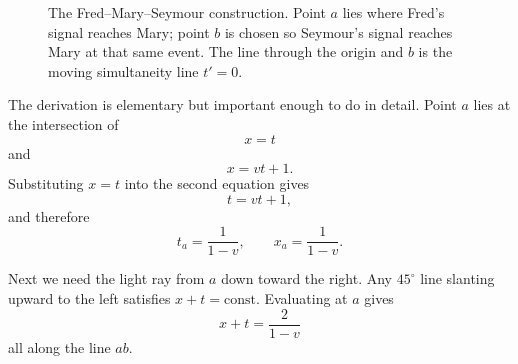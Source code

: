 \begin{figure}
\centering
{}
\caption{The Fred--Mary--Seymour construction. Point \(a\) lies where Fred's signal reaches Mary; point \(b\) is chosen so Seymour's signal reaches Mary at that same event. The line through the origin and \(b\) is the moving simultaneity line \(t'=0\).}
\end{figure}

The derivation is elementary but important enough to do in detail. Point \(a\) lies at the intersection of
\begin{equation}
x=t
\end{equation}
and
\begin{equation}
x=vt+1.
\end{equation}
Substituting \(x=t\) into the second equation gives
\begin{equation}
t=vt+1,
\end{equation}
and therefore
\begin{equation}
t_a=\frac{1}{1-v},\qquad x_a=\frac{1}{1-v}.
\end{equation}

Next we need the light ray from \(a\) down toward the right. Any \(45^\circ\) line slanting upward to the left satisfies \(x+t=\text{const}\). Evaluating at \(a\) gives
\begin{equation}
x+t=\frac{2}{1-v}
\end{equation}
all along the line \(ab\).

